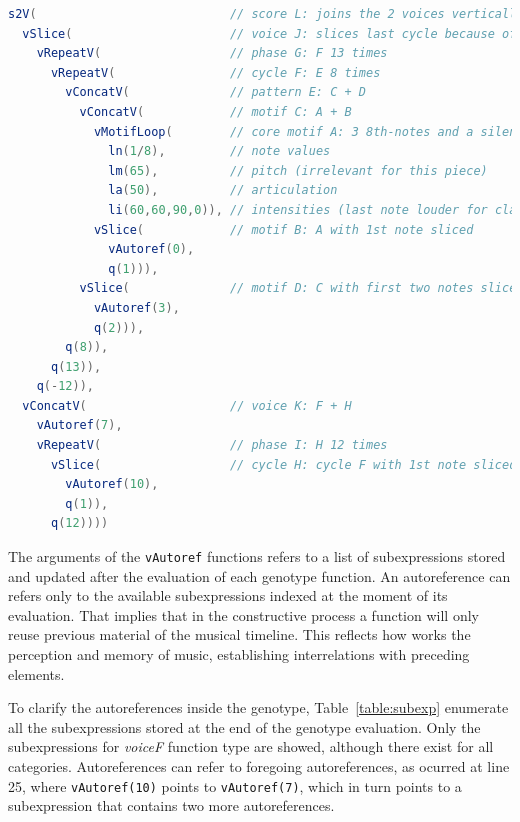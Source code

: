 \documentclass{article}
\begin{document}
\begin{lstlisting}[floatplacement=H, language=Java, caption={Decoded genotype of \emph{Clapping Music} model.}, label={lst:clapgeno}]
s2V(                           // score L: joins the 2 voices vertically
  vSlice(                      // voice J: slices last cycle because of phase lag
    vRepeatV(                  // phase G: F 13 times
      vRepeatV(                // cycle F: E 8 times 
        vConcatV(              // pattern E: C + D
          vConcatV(            // motif C: A + B
            vMotifLoop(        // core motif A: 3 8th-notes and a silence
              ln(1/8),         // note values
              lm(65),          // pitch (irrelevant for this piece)
              la(50),          // articulation
              li(60,60,90,0)), // intensities (last note louder for clarity) 
            vSlice(            // motif B: A with 1st note sliced
              vAutoref(0),
              q(1))),
          vSlice(              // motif D: C with first two notes sliced
            vAutoref(3),
            q(2))),
        q(8)),
      q(13)),
    q(-12)),
  vConcatV(                    // voice K: F + H
    vAutoref(7),
    vRepeatV(                  // phase I: H 12 times 
      vSlice(                  // cycle H: cycle F with 1st note sliced
        vAutoref(10),
        q(1)),
      q(12))))
\end{lstlisting}

The arguments of the \texttt{vAutoref} functions refers to a list of subexpressions stored and updated after the evaluation of each genotype function. An autoreference can refers only to the available subexpressions indexed at the moment of its evaluation. That implies that in the constructive process a function will only reuse previous material of the musical timeline. This reflects how works the perception and memory of music, establishing interrelations with preceding elements.

To clarify the autoreferences inside the genotype, Table~\ref{table:subexp} enumerate all the subexpressions stored at the end of the genotype evaluation. Only the subexpressions for \emph{voiceF} function type are showed, although there exist for all categories. Autoreferences can refer to foregoing autoreferences, as ocurred at line 25, where \texttt{vAutoref(10)} points to \texttt{vAutoref(7)}, which in turn points to a subexpression that contains two more autoreferences.
\end{document}
